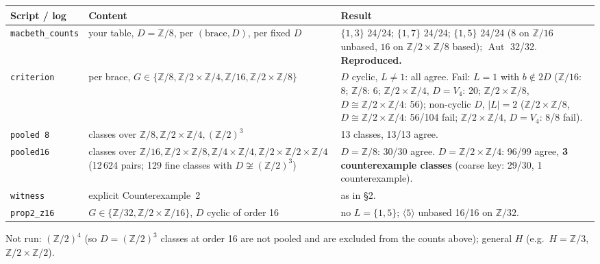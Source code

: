 \documentclass[11pt]{article}
\newcommand{\Z}{\mathbb{Z}}
\newcommand{\Aut}{\operatorname{Aut}}
\begin{document}
\begin{center}\small
\begin{tabularx}{\textwidth}{@{}lp{4.2cm}Y@{}}
\toprule
Script / log & Content & Result\\
\midrule
\texttt{macbeth\_counts} & your table, $D=\Z/8$, per $(\text{brace},D)$, per fixed $D$
& $\{1,3\}$ 24/24; $\{1,7\}$ 24/24; $\{1,5\}$ 24/24 ($8$ on $\Z/16$ unbased, $16$ on
$\Z/2\times\Z/8$ based); $\Aut$ 32/32. \textbf{Reproduced.}\\
\texttt{criterion} & per brace, $G\in\{\Z/8,\Z/2\times\Z/4,\Z/16,\Z/2\times\Z/8\}$ &
$D$ cyclic, $L\neq1$: all agree. Fail: $L=1$ with $b\notin2D$ ($\Z/16$: 8; $\Z/8$: 6;
$\Z/2\times\Z/4$, $D=V_4$: 20; $\Z/2\times\Z/8$, $D\cong\Z/2\times\Z/4$: 56); non-cyclic $D$, $|L|=2$ ($\Z/2\times\Z/8$, $D\cong\Z/2\times\Z/4$:
56/104 fail; $\Z/2\times\Z/4$, $D=V_4$: 8/8 fail).\\
\texttt{pooled 8} & classes over $\Z/8,\Z/2\times\Z/4,(\Z/2)^3$ & 13 classes, 13/13 agree.\\
\texttt{pooled16} & classes over $\Z/16,\Z/2\times\Z/8,\Z/4\times\Z/4,\Z/2\times\Z/2\times\Z/4$
(12\,624 pairs; 129 fine classes with $D\not\cong(\Z/2)^3$) & $D=\Z/8$: 30/30 agree. $D=\Z/2\times\Z/4$: 96/99 agree,
\textbf{3 counterexample classes} (coarse key: 29/30, 1 counterexample).\\
\texttt{witness} & explicit Counterexample~2 & as in \S2.\\
\texttt{prop2\_z16} & $G\in\{\Z/32,\Z/2\times\Z/16\}$, $D$ cyclic of order 16 & no $L=\{1,5\}$;
$\langle5\rangle$ unbased 16/16 on $\Z/32$.\\
\bottomrule
\end{tabularx}
\end{center}
Not run: $(\Z/2)^4$ (so $D=(\Z/2)^3$ classes at order 16 are not pooled and are excluded
from the counts above); general $H$ (e.g.\ $H=\Z/3$, $\Z/2\times\Z/2$).
\end{document}
